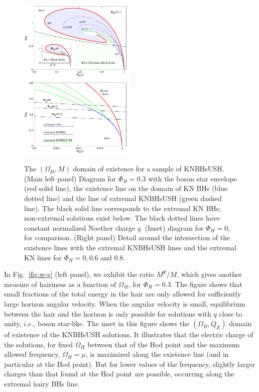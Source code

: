 \begin{figure}[h!]
  \begin{center}
    \includegraphics[width=0.497\textwidth]{papers/KerrNewman/BH-w-M}
     \includegraphics[width=0.497\textwidth]{papers/KerrNewman/zoom-w-M}
  \end{center}
  \caption{The $(\Omega_H,M)$ domain of existence for a sample of KNBHsUSH. (Main left panel) Diagram for $\Phi_H=0.3$ with the boson star envelope (red solid line), the existence line on the domain of KN BHs (blue dotted line) and the line of extremal KNBHsUSH (green dashed line). The black solid line corresponds to the extremal KN BHs; non-extremal solutions exist below. The black dotted lines have constant normalized Noether charge $q$. (Inset) diagram for $\Phi_H=0$, for comparison. (Right panel) Detail around the intersection of the existence lines with the extremal KNBHsUSH lines and the extremal KN lines for $\Phi_H=0,0.6$ and $0.8$.  
	}
  \label{fig:w-M}
\end{figure}
 
  
 In Fig.~\ref{fig:w-g} (left panel), we exhibit the ratio $ M^{\Psi}/M$, which gives another measure of hairiness
   as a function of $\Omega_H$,
for $\Phi_H=0.3$. The figure shows that small fractions of the total energy in the hair are only allowed for sufficiently large horizon angular velocity. When the angular velocity is small, equilibrium between the hair and the horizon is only possible for solutions with $q$ close to unity, $i.e.$, boson star-like. 
The inset in this figure shows the $(\Omega_H,Q_E)$ domain of existence of the KNBHsUSH solutions. It illustrates that the electric charge of the solutions, for fixed $\Omega_H$ between that of the Hod point and the maximum allowed frequency, $\Omega_H=\mu$, is maximized along the existence line (and in particular at the Hod point). But for lower values of the frequency, slightly larger charges than that found at the Hod point are possible, occurring along the extremal hairy BHs line.

